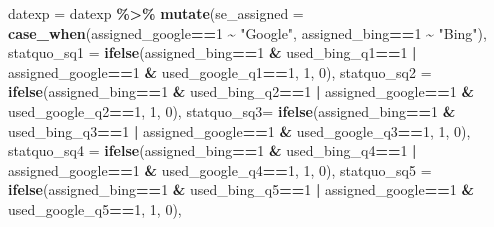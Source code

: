 \documentclass[
  11pt,
]{article}
\newenvironment{Shaded}{\begin{snugshade}}{\end{snugshade}}
\newcommand{\AttributeTok}[1]{\textcolor[rgb]{0.13,0.29,0.53}{#1}}
\newcommand{\DecValTok}[1]{\textcolor[rgb]{0.00,0.00,0.81}{#1}}
\newcommand{\FunctionTok}[1]{\textcolor[rgb]{0.13,0.29,0.53}{\textbf{#1}}}
\newcommand{\NormalTok}[1]{#1}
\newcommand{\OtherTok}[1]{\textcolor[rgb]{0.56,0.35,0.01}{#1}}
\newcommand{\SpecialCharTok}[1]{\textcolor[rgb]{0.81,0.36,0.00}{\textbf{#1}}}
\newcommand{\StringTok}[1]{\textcolor[rgb]{0.31,0.60,0.02}{#1}}
\begin{document}
\begin{Shaded}
\begin{Highlighting}[]
\NormalTok{datexp }\OtherTok{=}\NormalTok{ datexp }\SpecialCharTok{\%\textgreater{}\%} 
  \FunctionTok{mutate}\NormalTok{(}\AttributeTok{se\_assigned =} \FunctionTok{case\_when}\NormalTok{(assigned\_google}\SpecialCharTok{==}\DecValTok{1} \SpecialCharTok{\textasciitilde{}} \StringTok{"Google"}\NormalTok{,}
\NormalTok{                                 assigned\_bing}\SpecialCharTok{==}\DecValTok{1} \SpecialCharTok{\textasciitilde{}} \StringTok{"Bing"}\NormalTok{),}
         \AttributeTok{statquo\_sq1 =} \FunctionTok{ifelse}\NormalTok{(assigned\_bing}\SpecialCharTok{==}\DecValTok{1} \SpecialCharTok{\&}\NormalTok{ used\_bing\_q1}\SpecialCharTok{==}\DecValTok{1} \SpecialCharTok{|}\NormalTok{ assigned\_google}\SpecialCharTok{==}\DecValTok{1} \SpecialCharTok{\&}\NormalTok{ used\_google\_q1}\SpecialCharTok{==}\DecValTok{1}\NormalTok{, }\DecValTok{1}\NormalTok{, }\DecValTok{0}\NormalTok{),}
         \AttributeTok{statquo\_sq2 =} \FunctionTok{ifelse}\NormalTok{(assigned\_bing}\SpecialCharTok{==}\DecValTok{1} \SpecialCharTok{\&}\NormalTok{ used\_bing\_q2}\SpecialCharTok{==}\DecValTok{1} \SpecialCharTok{|}\NormalTok{ assigned\_google}\SpecialCharTok{==}\DecValTok{1} \SpecialCharTok{\&}\NormalTok{ used\_google\_q2}\SpecialCharTok{==}\DecValTok{1}\NormalTok{, }\DecValTok{1}\NormalTok{, }\DecValTok{0}\NormalTok{),}
         \AttributeTok{statquo\_sq3=} \FunctionTok{ifelse}\NormalTok{(assigned\_bing}\SpecialCharTok{==}\DecValTok{1} \SpecialCharTok{\&}\NormalTok{ used\_bing\_q3}\SpecialCharTok{==}\DecValTok{1} \SpecialCharTok{|}\NormalTok{ assigned\_google}\SpecialCharTok{==}\DecValTok{1} \SpecialCharTok{\&}\NormalTok{ used\_google\_q3}\SpecialCharTok{==}\DecValTok{1}\NormalTok{, }\DecValTok{1}\NormalTok{, }\DecValTok{0}\NormalTok{),}
         \AttributeTok{statquo\_sq4 =} \FunctionTok{ifelse}\NormalTok{(assigned\_bing}\SpecialCharTok{==}\DecValTok{1} \SpecialCharTok{\&}\NormalTok{ used\_bing\_q4}\SpecialCharTok{==}\DecValTok{1} \SpecialCharTok{|}\NormalTok{ assigned\_google}\SpecialCharTok{==}\DecValTok{1} \SpecialCharTok{\&}\NormalTok{ used\_google\_q4}\SpecialCharTok{==}\DecValTok{1}\NormalTok{, }\DecValTok{1}\NormalTok{, }\DecValTok{0}\NormalTok{),}
         \AttributeTok{statquo\_sq5 =} \FunctionTok{ifelse}\NormalTok{(assigned\_bing}\SpecialCharTok{==}\DecValTok{1} \SpecialCharTok{\&}\NormalTok{ used\_bing\_q5}\SpecialCharTok{==}\DecValTok{1} \SpecialCharTok{|}\NormalTok{ assigned\_google}\SpecialCharTok{==}\DecValTok{1} \SpecialCharTok{\&}\NormalTok{ used\_google\_q5}\SpecialCharTok{==}\DecValTok{1}\NormalTok{, }\DecValTok{1}\NormalTok{, }\DecValTok{0}\NormalTok{),}

\end{Highlighting}
\end{Shaded}
\end{document}
